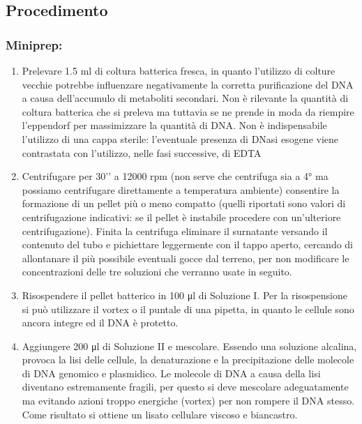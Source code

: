 \subsection{Procedimento}


\subsubsection{Miniprep: }

\begin{enumerate}
  \item Prelevare 1.5 ml di coltura batterica fresca, in quanto l’utilizzo di colture vecchie potrebbe
	influenzare negativamente la corretta purificazione del DNA a causa dell’accumulo di metaboliti secondari.
	Non è rilevante la quantità di coltura batterica che si preleva ma tuttavia se ne prende in moda da riempire
	l’eppendorf per massimizzare la quantità di DNA. Non è indispensabile l’utilizzo di una cappa sterile:
	l’eventuale presenza di DNasi esogene viene contrastata con l’utilizzo, nelle fasi successive, di EDTA
  \item Centrifugare per 30’’ a 12000 rpm (non serve che centrifuga sia a 4° ma possiamo centrifugare direttamente
	a temperatura ambiente) consentire la formazione di un pellet più o meno
	compatto (quelli riportati sono valori di centrifugazione indicativi: se il pellet è instabile procedere
	con un’ulteriore centrifugazione). Finita la centrifuga eliminare il surnatante versando il contenuto del tubo e
	pichiettare leggermente con il tappo aperto, cercando di allontanare il più possibile eventuali gocce dal terreno,
	per non modificare le concentrazioni delle tre soluzioni che verranno usate in seguito.

  \item Risospendere il pellet batterico in 100 μl di Soluzione I. Per la risospensione si può utilizzare il vortex o
	il puntale di una pipetta, in quanto le cellule sono ancora integre ed il DNA è protetto.

  \item Aggiungere 200 μl di Soluzione II e mescolare. Essendo una soluzione alcalina, provoca la lisi delle cellule,
	la denaturazione e la  precipitazione delle molecole di DNA genomico e plasmidico.
	Le molecole di DNA a causa della lisi diventano estremamente fragili, per questo si deve mescolare
	adeguatamente ma evitando azioni troppo energiche (vortex) per non rompere il DNA stesso.
	Come risultato si ottiene un lisato cellulare viscoso e biancastro.


\end{enumerate}
